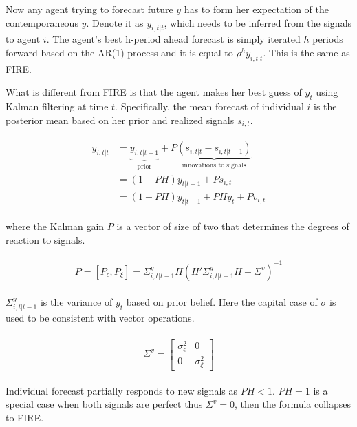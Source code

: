 \documentclass[12pt]{article}
\begin{document}
	
	Now any agent trying to forecast future $y$ has to form her expectation of the contemporaneous $y$. Denote it as  $y_{i,t|t}$, which needs to be inferred from the signals to agent $i$. The agent's best h-period ahead forecast is simply iterated $h$ periods forward based on the AR(1) process and it is equal to $\rho^h y_{i,t|t}$. This is the same as FIRE.
	
	What is different from FIRE is that the agent makes her best guess of $y_t$ using Kalman filtering at time $t$. Specifically, the mean forecast of individual $i$ is the posterior mean based on her prior and realized signals $s_{i,t}$. 
	
	
	\begin{eqnarray}
		\begin{aligned}
			y_{i,t|t}  
			& =  \underbrace{y_{i,t|t-1}}_{\text{prior}} + P \underbrace {(s_{i,t|t}-s_{i,t|t-1})}_{\text{innovations to signals}} \\
			& = (1-PH) y_{t|t-1} + Ps_{i,t} \\
			& = (1-PH) y_{t|t-1} + PH y_{t} + P v_{i,t} 
		\end{aligned}
	\end{eqnarray}
	
	where the Kalman gain $P$ is a vector of size of two that determines the degrees of reaction to signals. 
	
	
	\begin{eqnarray}
		\begin{aligned}
			P = [P_\epsilon,P_\xi]= \Sigma^y_{i,t|t-1} H(H'\Sigma^y_{i,t|t-1} H + \Sigma^v)^{-1} 
		\end{aligned}
	\end{eqnarray}
	
	$\Sigma^y_{i,t|t-1}$  is the variance of  $y_t$ based on prior belief. Here the capital case of $\sigma$ is used to be consistent with vector operations. 
	
	\begin{eqnarray}
		\begin{aligned}
			\Sigma^v =  \left[ \begin{matrix} 
				\sigma^2_{\epsilon} &  0 \\ 
				0 & \sigma^2_\xi \end{matrix}\right] 
		\end{aligned}
	\end{eqnarray}
	
	Individual forecast partially responds to new signals as  $PH<1$. $PH=1$ is a special case when both signals are perfect thus $\Sigma^v = 0$, then the formula collapses to FIRE. 
	
\end{document}

